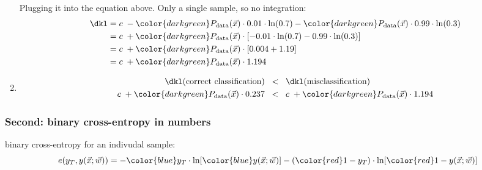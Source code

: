 \begin{enumerate}
\begin{itemize}
	\end{itemize}
	Plugging it into the equation above. Only a single sample, so no integration:
	\begin{align}
\dkl
&= c \; -
		{ \color{darkgreen} P_{\text{data}}(\vec x) }
		\cdot
		0.01 \cdot 
			\ln(0.7)
		-
		{ \color{darkgreen} P_{\text{data}}(\vec x) }
		\cdot
		0.99 \cdot 
			\ln(0.3)\\
&= c \; +
		{ \color{darkgreen} P_{\text{data}}(\vec x) }
		\cdot
		\lbrack
		-0.01 \cdot 
			\ln(0.7)
		-0.99 \cdot 
			\ln(0.3)
		\rbrack\\
&= c \; +
		{ \color{darkgreen} P_{\text{data}}(\vec x) }
		\cdot
		\lbrack
		0.004 + 1.19
		\rbrack\\
&= c \; +
		{ \color{darkgreen} P_{\text{data}}(\vec x) }
		\cdot
		1.194
	\end{align}
\item[]
\begin{align}
\dkl(\text{correct classification})
&\;\;<\;\;
\dkl(\text{misclassification})\\
c \; +
		{ \color{darkgreen} P_{\text{data}}(\vec x) }
		\cdot
		0.237
&\;\;<\;\;
	c \; +
		{ \color{darkgreen} P_{\text{data}}(\vec x) }
		\cdot
		1.194
\end{align}
\end{enumerate}

\subsubsection{Second: binary cross-entropy in numbers}

binary cross-entropy for an indivudal sample:
\begin{equation}
e(y_T, y(\vec x;\vec w)) = 
-
{\color{blue}y_T} \cdot
	 \ln \lbrack {\color{blue}y(\vec x;\vec w)} \rbrack
	 - ( {\color{red}1-y_T} ) \cdot
	 \ln \lbrack {\color{red}1-y(\vec x;\vec w)} \rbrack 
\label{eq:bincrossentropysample}
\end{equation}

